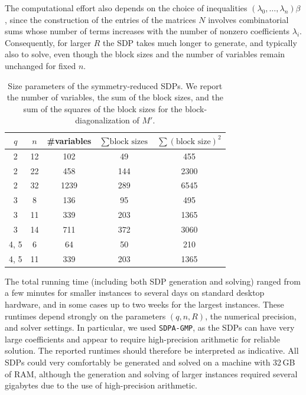 \documentclass[10pt,a4paper]{article}
\theoremstyle{definition}
\begin{document}
The computational effort also depends on the choice of inequalities $(\lambda_0,\ldots,\lambda_n)\beta$, since the construction of the entries of the matrices $N$ involves combinatorial sums whose number of terms increases with the number of nonzero coefficients $\lambda_i$. Consequently, for larger $R$ the SDP takes much longer to generate, and typically also to solve, even though the block sizes and the number of variables remain unchanged for fixed $n$.

\begin{table}[H]\small
\centering
\begin{tabular}{c c c c c}
\hline
$q$ & $n$ & \#variables & $\sum \text{block sizes}$ & $\sum (\text{block size})^2$ \\
\hline
2 & 12 & 102 & 49 & 455 \\
2 & 22 & 458 & 144 & 2300 \\
2 & 32 & 1239 & 289 & 6545 \\
\hline
3 & 8 & 136 & 95 & 495 \\
3 & 11 & 339 & 203 & 1365 \\
3 & 14 & 711 & 372 & 3060 \\
\hline 
4, 5 & 6 & 64 & 50 & 210 \\
4, 5 & 11 & 339 & 203 & 1365 \\
\hline
\end{tabular}
\caption{\small Size parameters of the symmetry-reduced SDPs. We report the number of variables, the sum of the block sizes, and the sum of the squares of the block sizes for the block-diagonalization of $M'$.}
\label{table:sdpsizes}
\end{table}


The total running time (including both SDP generation and solving) ranged from a few minutes for smaller instances to several days on standard desktop hardware, and in some cases up to two weeks for the largest instances. These runtimes depend strongly on the parameters $(q,n,R)$, the numerical precision, and solver settings. In particular, we used \texttt{SDPA-GMP}, as the SDPs can have very large coefficients and appear to require high-precision arithmetic for reliable solution. The reported runtimes should therefore be interpreted as indicative. All SDPs could very comfortably be generated and solved on a machine with 32\,GB of RAM, although the generation and solving of larger instances required several gigabytes due to the use of high-precision arithmetic.
\end{document}
